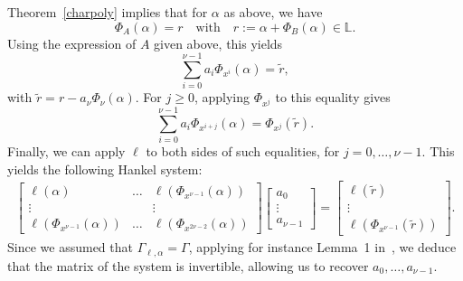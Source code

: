 \documentclass[sigconf]{acmart}
\renewcommand{\L}{\mathbb{L}}
\begin{document}
Theorem~\ref{charpoly} implies that for $\alpha$ as above, we have
\[\Phi_A(\alpha)=r \quad\text{with}\quad r:=\alpha + \Phi_B(\alpha) \in \L.\]
Using the expression of $A$ given above, this yields
\[ \sum_{i = 0}^{\nu - 1}a_i \Phi_{x^{i}}(\alpha) = \tilde r,\]
with $\tilde r =  r-a_\nu \Phi_\nu(\alpha)$.
For $j \ge 0$, applying $\Phi_{x^j}$ to this equality
gives
\[ \sum_{i = 0}^{\nu - 1}a_i \Phi_{x^{i+j}}(\alpha) = \Phi_{x^j}(\tilde r).\]
Finally, we can apply $\ell$ to both sides of such equalities,
for $j=0,\dots,\nu-1$.
This yields the following Hankel system:
\begin{align}\label{eq:A}
  \begin{bmatrix}   \ell(\alpha) & \ldots & \ell(\Phi_{x^{\nu-1}}(\alpha)) \\
    \vdots & & \vdots  \\ 
  \ell(\Phi_{x^{\nu-1}}(\alpha)) &  \ldots & \ell(\Phi_{x^{2\nu-2}}(\alpha))
\end{bmatrix} 
\begin{bmatrix} a_0  \\ \vdots \\ a_{\nu-1} \end{bmatrix} 
= 
\begin{bmatrix} \ell(\tilde r) \\ \vdots \\   \ell(\Phi_{x^{\nu-1}}(\tilde r)) \end{bmatrix}. 
\end{align}
Since we assumed that $\Gamma_{\ell,\alpha}=\Gamma$, applying for
instance Lemma~1 in~\cite{Kaltofen:1991:PEP:113379.113396}, we deduce 
that the matrix of the system is invertible, allowing us to
recover $a_0,\dots,a_{\nu-1}$.
\end{document}
